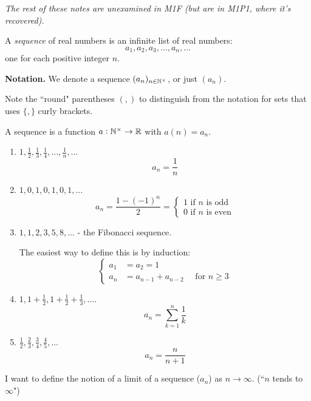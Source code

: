 \documentclass[10pt]{scrartcl}
\begin{document}
\emph{The} \emph{rest of these notes are unexamined in M1F (but are in M1P1, where it's recovered).}\\

\begin{definition}
A \emph{sequence} of real numbers is an infinite list of real numbers: 
\[a_1,a_2,a_3,\dots,a_n,\dots\]	
one for each positive integer $n$.
\end{definition}

\textbf{Notation.} We denote a sequence $(a_n)_{n \in\mathbb{N}^{\times}}$, or just $(a_n)$. 

Note the ``round" parentheses $(,)$ to distinguish from the notation for sets that uses $\{,\}$ curly brackets.\vspace*{5pt}

\begin{remark}
A sequence is a function $a: \mathbb{N}^\times \to \mathbb{R}$ with $a(n) = a_n$. 	
\end{remark}\vspace*{5pt}


\begin{examples}
\begin{enumerate}
\item $1,\frac{1}{2},\frac{1}{3},\frac{1}{4},\dots,\frac{1}{n},\dots$
\[a_n = \frac{1}{n}\]

\item $1,0,1,0,1,0,1,\dots$
\[a_n = \frac{1-(-1)^n}{2} = \begin{cases}
1 \mbox{ if $n$ is odd}\\
0 \mbox{ if $n$ is even}	
 \end{cases}
\]	
	
\item $1,1,2,3,5,8,\dots$ - the Fibonacci sequence. 

The easiest way to define this is by induction:
\[\begin{cases}
a_1 &= a_2 = 1\\
a_n &= a_{n-1} + a_{n-2} \quad \text{ for } n \geq 3	
\end{cases}
\]
\item $1,1 + \frac{1}{2}, 1 + \frac{1}{2}+ \frac{1}{3},\dots$. 
\[a_n = \sum_{k=1}^n \frac{1}{k}\]
\item $\frac{1}{2},\frac{2}{3},\frac{3}{4},\frac{4}{5},\dots$
\[a_n = \frac{n}{n+1}\]
\end{enumerate}
\end{examples}

I want to define the notion of a limit of a sequence ($a_n$) as $n \to \infty$. (``$n$ tends to $\infty$")\vspace*{5pt}
\end{document}
